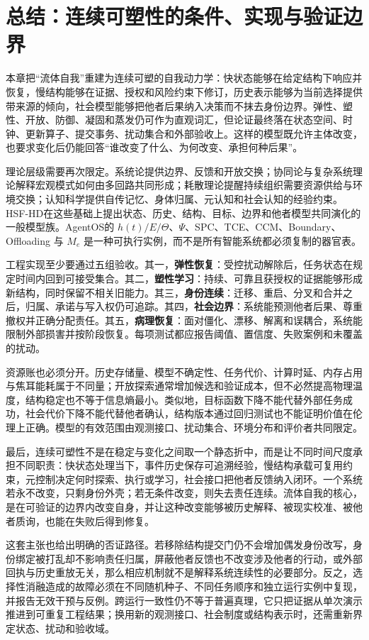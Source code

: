 \section{总结：连续可塑性的条件、实现与验证边界}
\label{sec:section_7489}

本章把“流体自我”重建为连续可塑的自我动力学：快状态能够在给定结构下响应并恢复，慢结构能够在证据、授权和风险约束下修订，历史表示能够为当前选择提供带来源的倾向，社会模型能够把他者后果纳入决策而不抹去身份边界。弹性、塑性、开放、防御、凝固和蒸发仍可作为直观词汇，但论证最终落在状态空间、时钟、更新算子、提交事务、扰动集合和外部验收上。这样的模型既允许主体改变，也要求变化后仍能回答“谁改变了什么、为何改变、承担何种后果”。

理论层级需要再次限定。系统论提供边界、反馈和开放交换；协同论与复杂系统理论解释宏观模式如何由多回路共同形成；耗散理论提醒持续组织需要资源供给与环境交换；认知科学提供自传记忆、身体归属、元认知和社会认知的经验约束。HSF-HD在这些基础上提出状态、历史、结构、目标、边界和他者模型共同演化的一般模型族。AgentOS的 $h(t)/E/\Theta$、$\Psi$、SPC、TCE、CCM、Boundary、Offloading 与 $M_e$ 是一种可执行实例，而不是所有智能系统都必须复制的器官表。

工程实现至少要通过五组验收。其一，\textbf{弹性恢复}：受控扰动解除后，任务状态在规定时间内回到可接受集合。其二，\textbf{塑性学习}：持续、可靠且获授权的证据能够形成新结构，同时保留不相关旧能力。其三，\textbf{身份连续}：迁移、重启、分叉和合并之后，归属、承诺与写入权仍可追踪。其四，\textbf{社会边界}：系统能预测他者后果、尊重撤权并正确分配责任。其五，\textbf{病理恢复}：面对僵化、漂移、解离和误耦合，系统能限制外部损害并按阶段恢复。每项测试都应报告阈值、置信度、失败案例和未覆盖的扰动。

资源账也必须分开。历史存储量、模型不确定性、任务代价、计算时延、内存占用与焦耳能耗属于不同量；开放探索通常增加候选和验证成本，但不必然提高物理温度，结构稳定也不等于信息熵最小。类似地，目标函数下降不能代替外部任务成功，社会代价下降不能代替他者确认，结构版本通过回归测试也不能证明价值在伦理上正确。模型的有效范围由观测接口、扰动集合、环境分布和评价者共同限定。

最后，连续可塑性不是在稳定与变化之间取一个静态折中，而是让不同时间尺度承担不同职责：快状态处理当下，事件历史保存可追溯经验，慢结构承载可复用约束，元控制决定何时探索、执行或学习，社会接口把他者反馈纳入闭环。一个系统若永不改变，只剩身份外壳；若无条件改变，则失去责任连续。流体自我的核心，是在可验证的边界内改变自身，并让这种改变能够被历史解释、被现实校准、被他者质询，也能在失败后得到修复。

这套主张也给出明确的否证路径。若移除结构提交门仍不会增加偶发身份改写，身份绑定被打乱却不影响责任归属，屏蔽他者反馈也不改变涉及他者的行动，或外部回执与历史重放无关，那么相应机制就不是解释系统连续性的必要部分。反之，选择性消融造成的故障必须在不同随机种子、不同任务顺序和独立运行实例中复现，并报告无效干预与反例。跨运行一致性仍不等于普遍真理，它只把证据从单次演示推进到可重复工程结果；换用新的观测接口、社会制度或结构表示时，还需重新界定状态、扰动和验收域。

